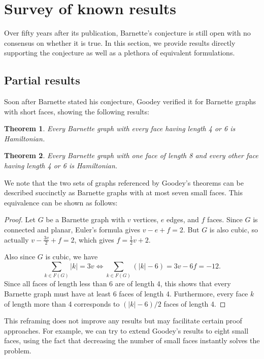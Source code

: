 \documentclass{scrartcl}
\theoremstyle{definition}
\theoremstyle{plain}
\newtheorem{theorem}{Theorem}
\begin{document}
\section*{Survey of known results}

Over fifty years after its publication, Barnette's conjecture is still open with no consensus on
whether it is true.
In this section, we provide results directly supporting the conjecture as well as a plethora of
equivalent formulations.

\subsection*{Partial results}

Soon after Barnette stated his conjecture, Goodey \cite{Goodey1975-sz} verified it for Barnette
graphs with short faces, showing the following results:

\begin{theorem}
    Every Barnette graph with every face having length 4 or 6 is Hamiltonian.
\end{theorem}

\begin{theorem}
    Every Barnette graph with one face of length 8 and every other face having length 4 or 6 is
    Hamiltonian.
\end{theorem}

We note that the two sets of graphs referenced by Goodey's theorems can be described succinctly as
Barnette graphs with at most seven small faces.
This equivalence can be shown as follows:

\begin{proof}
    Let $G$ be a Barnette graph with $v$ vertices, $e$ edges, and $f$ faces.
    Since $G$ is connected and planar, Euler's formula gives $v-e+f=2$.
    But $G$ is also cubic, so actually $v-\frac{3v}2+f=2$, which gives $f=\frac{1}2v+2$.

    Also since $G$ is cubic, we have
    $$\sum_{k\in F(G)}\lvert k\rvert=3v\iff \sum_{k\in F(G)}\left(\lvert k\rvert-6\right)=3v-6f=-12\text{.}$$
    Since all faces of length less than 6 are of length 4, this shows that every Barnette graph
    must have at least 6 faces of length 4.
    Furthermore, every face $k$ of length more than 4 corresponds to $(\lvert k\rvert-6)/2$ faces
    of length 4.
\end{proof}

This reframing does not improve any results but may facilitate certain proof approaches.
For example, we can try to extend Goodey's results to eight small faces, using the fact that
decreasing the number of small faces instantly solves the problem.
\end{document}
